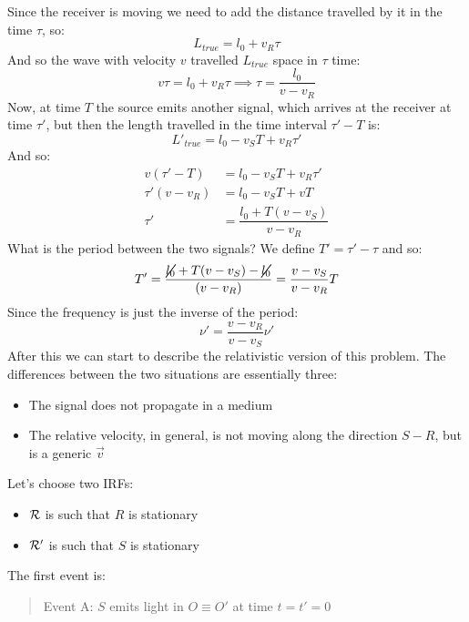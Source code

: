 Since the receiver is moving we need to add the distance travelled by it in the time $\tau$, so:
\begin{equation}
  L_{true} = l_0 + v_{R}\tau
\end{equation}
And so the wave with velocity $v$ travelled $L_{true}$ space in $\tau$ time:
\begin{equation}
  v\tau = l_0 + v_{R}\tau \implies \tau = \dfrac{l_0}{v-v_{R}}
\end{equation}
Now, at time $T$ the source emits another signal, which arrives at the receiver at time $\tau'$, but then the length travelled in the time interval $\tau'-T$ is:
\begin{equation}
  L'_{true} = l_0 - v_{S}T + v_{R}\tau'
\end{equation}
And so:
\begin{equation}
  \begin{split}
    v(\tau'-T) &= l_0 - v_{S}T + v_{R}\tau' \\[8pt]
    \tau'(v-v_{R}) &= l_0 -v_{S}T + vT \\[8pt]
    \tau' &= \dfrac{l_0 +T(v-v_{S})}{v-v_{R}}
  \end{split}
\end{equation}
What is the period between the two signals? We define $T' = \tau' - \tau$ and so:
\begin{equation}
  T' = \dfrac{\cancel{l_0} +T(v-v_{S}) - \cancel{l_0}}{(v-v_{R})} = \dfrac{v-v_{S}}{v-v_{R}}T
\end{equation}
Since the frequency is just the inverse of the period:
\begin{equation}
  \boxed{\nu' = \dfrac{v-v_{R}}{v-v_{S}}\nu'}
\end{equation}
After this we can start to describe the relativistic version of this problem. The differences between the two situations are essentially three:
\begin{itemize}
  \item The signal does not propagate in a medium
  \item The relative velocity, in general, is not moving along the direction $S-R$, but is a generic $\vec{v}$
\end{itemize}
Let's choose two IRFs:
\begin{itemize}
  \item $\mathcal{R}$ is such that $R$ is stationary
  \item $\mathcal{R'}$ is such that $S$ is stationary
\end{itemize}
The first event is:
\begin{quotation}
  Event A: $S$ emits light in $O \equiv O'$ at time $t = t' = 0$
\end{quotation}
